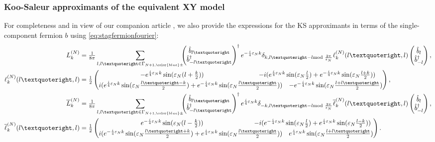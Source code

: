 \documentclass[a4paper, 11pt]{article}
\DeclareMathOperator{\1}{\mathds{1}}
\begin{document}
\subsubsection{Koo-Saleur approximants of the equivalent XY model}
\label{sec:latvirastag}
For completeness and in view of our companion article \cite{OsborneCFTsim}, we also provide the expressions for the KS approximants in terms of the single-component fermion $b$ using \eqref{eq:stagfermionfourier}:
\begin{align}
\label{eq:latvirastag}
L_k^{(N)} & = \tfrac{1}{8\pi}\sum_{l,l’\in\Gamma_{N+1,{\color{blue}\pm}}} \!\!\! \begin{pmatrix} \hat{b}_{l’} \\ \hat{b}^{\dag}_{-l’} \end{pmatrix}^{\dag} e^{-\frac{i}{4}\varepsilon_{N}k} \delta_{k,l’-l\!\!\!\!\mod\frac{2\pi}{\varepsilon_{N}}}  \ell^{(N)}_{k}(l’,l) \begin{pmatrix} \hat{b}_{l} \\ \hat{b}^{\dag}_{-l} \end{pmatrix}, \\ \nonumber
\ell^{(N)}_{k}(l’,l) & = \tfrac{1}{2}\begin{pmatrix} \hspace{-2cm} -e^{\frac{i}{4}\varepsilon_{N}k}\sin(\varepsilon_{N}(l+\tfrac{k}{2})) & \hspace{-2cm} -i(e^{\frac{i}{4}\varepsilon_{N}k}\sin(\varepsilon_{N}\tfrac{l}{2})+e^{-\frac{i}{4}\varepsilon_{N}k}\sin(\varepsilon_{N}\tfrac{l+k}{2})) \\[0.1cm] i(e^{\frac{i}{4}\varepsilon_{N}k}\sin(\varepsilon_{N}\tfrac{l’-k}{2})+e^{-\frac{i}{4}\varepsilon_{N}k}\sin(\varepsilon_{N}\tfrac{l’}{2})) & -e^{-\frac{i}{4}\varepsilon_{N}k}\sin(\varepsilon_{N}\tfrac{l+l’}{2}) \end{pmatrix}, \\ \nonumber
\overline{L}_k^{(N)} & = \tfrac{1}{8\pi}\sum_{l,l’\in\Gamma_{N+1,{\color{blue}\pm}}} \!\!\! \begin{pmatrix} \hat{b}_{l’} \\ \hat{b}^{\dag}_{-l’} \end{pmatrix}^{\dag} e^{\frac{i}{4}\varepsilon_{N}k}\delta_{-k,l’-l\!\!\!\!\mod\frac{2\pi}{\varepsilon_{N}}} \overline{\ell}^{(N)}_{k}(l’,l) \begin{pmatrix} \hat{b}_{l} \\ \hat{b}^{\dag}_{-l} \end{pmatrix}, \\ \nonumber
\overline{\ell}^{(N)}_{k}(l’,l) & = \tfrac{1}{2}\begin{pmatrix} \hspace{-2cm} e^{-\frac{i}{4}\varepsilon_{N}k}\sin(\varepsilon_{N}(l-\tfrac{k}{2})) & \hspace{-2cm} -i(e^{-\frac{i}{4}\varepsilon_{N}k}\sin(\varepsilon_{N}\tfrac{l}{2})+e^{\frac{i}{4}\varepsilon_{N}k}\sin(\varepsilon_{N}\tfrac{l-k}{2})) \\[0.1cm] i(e^{-\frac{i}{4}\varepsilon_{N}k}\sin(\varepsilon_{N}\tfrac{l’+k}{2})+e^{\frac{i}{4}\varepsilon_{N}k}\sin(\varepsilon_{N}\tfrac{l’}{2})) & e^{\frac{i}{4}\varepsilon_{N}k}\sin(\varepsilon_{N}\tfrac{l+l’}{2}) \end{pmatrix}.
\end{align}
\end{document}
